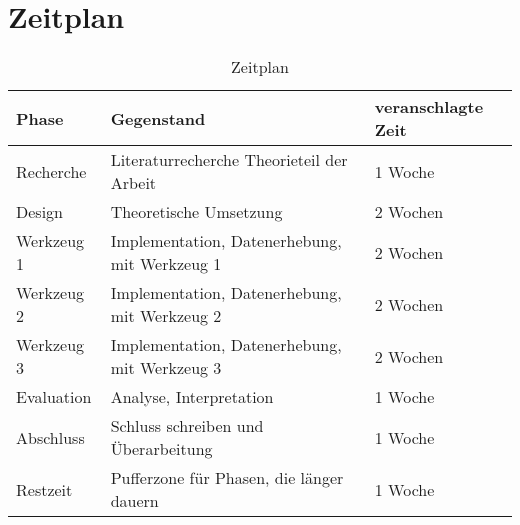 \documentclass[
	12pt,
	a4paper,
	BCOR10mm,
	DIV14,
	listof=totoc,
	bibliography=totoc,
	headsepline
]{scrreprt}
\begin{document}
\chapter{Zeitplan}
\label{Zeitplan}
\begin{table}[h]
\begin{center}
\begin{tabular} {|l|p{4cm}|l|}
	\hline
	\textbf{Phase} & \textbf{Gegenstand} & \textbf{veranschlagte Zeit} \\ \hline
	Recherche & Literaturrecherche \newline Theorieteil der Arbeit & 1 Woche \\ \hline
	Design & Theoretische Umsetzung & 2 Wochen \\ \hline
	Werkzeug 1 & Implementation, \newline Datenerhebung, mit Werkzeug 1 & 2 Wochen \\ \hline
	Werkzeug 2 & Implementation, \newline Datenerhebung, mit Werkzeug 2 & 2 Wochen \\ \hline
	Werkzeug 3 & Implementation, \newline Datenerhebung, mit Werkzeug 3 & 2 Wochen \\ \hline
	Evaluation & Analyse, \newline Interpretation & 1 Woche \\ \hline
	Abschluss & Schluss schreiben und Überarbeitung & 1 Woche \\ \hline
	Restzeit & Pufferzone für Phasen, die länger dauern & 1 Woche \\ \hline
\end{tabular}
\end{center}
\caption{Zeitplan}
\label{tab:timeplan}
\end{table}
\end{document}
